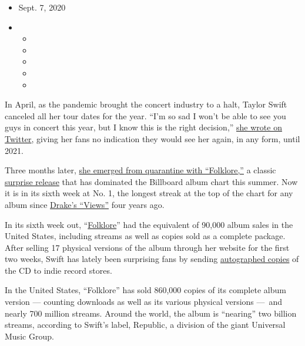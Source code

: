 \begin{itemize}
\item
  Sept. 7, 2020
\item
  \begin{itemize}
  \item
  \item
  \item
  \item
  \item
  \end{itemize}
\end{itemize}

In April, as the pandemic brought the concert industry to a halt, Taylor
Swift canceled all her tour dates for the year. ``I'm so sad I won't be
able to see you guys in concert this year, but I know this is the right
decision,''
\href{https://twitter.com/taylorswift13/status/1251193743912456192}{she
wrote on Twitter}, giving her fans no indication they would see her
again, in any form, until 2021.

Three months later,
\href{https://www.nytimes3xbfgragh.onion/2020/07/26/arts/music/taylor-swift-folklore-review.html}{she
emerged from quarantine with ``Folklore,''} a classic
\href{https://www.nytimes3xbfgragh.onion/2018/07/01/insider/covering-beyonce-everything-is-love.html}{surprise
release} that has dominated the Billboard album chart this summer. Now
it is in its sixth week at No. 1, the longest streak at the top of the
chart for any album since
\href{https://www.nytimes3xbfgragh.onion/2016/05/10/arts/music/drake-views-billboard-sales.html}{Drake's
``Views''} four years ago.

In its sixth week out,
``\href{https://www.nytimes3xbfgragh.onion/2020/07/26/arts/music/taylor-swift-folklore-review.html}{Folklore}''
had the equivalent of 90,000 album sales in the United States, including
streams as well as copies sold as a complete package. After selling 17
physical versions of the album through her website for the first two
weeks, Swift has lately been surprising fans by sending
\href{https://www.nytimes3xbfgragh.onion/2020/08/24/arts/music/taylor-swift-folklore-billboard.html}{autographed
copies} of the CD to indie record stores.

In the United States, ``Folklore'' has sold 860,000 copies of its
complete album version --- counting downloads as well as its various
physical versions ---~and nearly 700 million streams. Around the world,
the album is ``nearing'' two billion streams, according to Swift's
label, Republic, a division of the giant Universal Music Group.

